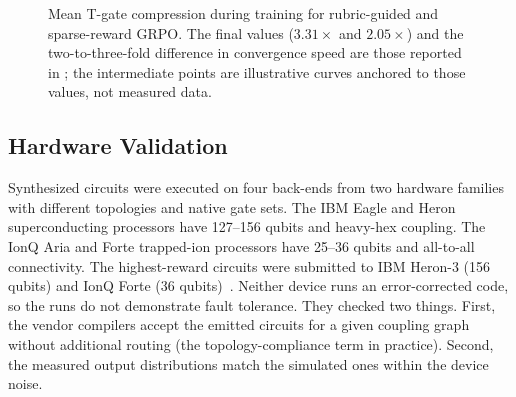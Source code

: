 \begin{figure}[htbp]
\centering
{}
\caption{Mean T-gate compression during training for rubric-guided and sparse-reward GRPO. The final values ($3.31\times$ and $2.05\times$) and the two-to-three-fold difference in convergence speed are those reported in \cite{guo2026rubriq}; the intermediate points are illustrative curves anchored to those values, not measured data.}
\label{fig:syn:training}
\end{figure}

\subsection{Hardware Validation}\label{sec:syn:hardware}

Synthesized circuits were executed on four back-ends from two hardware families with different topologies and native gate sets. The IBM Eagle and Heron superconducting processors have 127--156 qubits and heavy-hex coupling. The IonQ Aria and Forte trapped-ion processors have 25--36 qubits and all-to-all connectivity. The highest-reward circuits were submitted to IBM Heron-3 (156 qubits) and IonQ Forte (36 qubits)~\cite{guo2026rubriq}. Neither device runs an error-corrected code, so the runs do not demonstrate fault tolerance. They checked two things. First, the vendor compilers accept the emitted circuits for a given coupling graph without additional routing (the topology-compliance term in practice). Second, the measured output distributions match the simulated ones within the device noise.

